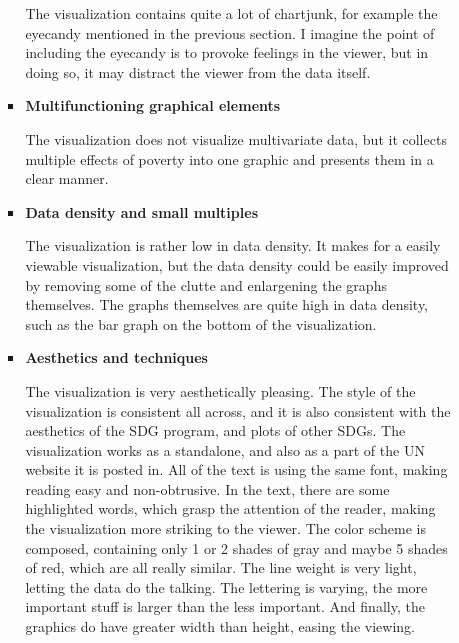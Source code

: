 \documentclass[11pt,a4paper,titlepage]{article}
\begin{document}
\begin{enumerate}
\begin{enumerate}
\begin{itemize}
            The visualization contains quite a lot of chartjunk, for example the eyecandy mentioned in the previous section. I imagine the point of including the eyecandy is to provoke feelings in the viewer, but in doing so, it may distract the viewer from the data itself.
            \item \textbf{Multifunctioning graphical elements}
            
            The visualization does not visualize multivariate data, but it collects multiple effects of poverty into one graphic and presents them in a clear manner.
            \item \textbf{Data density and small multiples}
            
            The visualization is rather low in data density. It makes for a easily viewable visualization, but the data density could be easily improved by removing some of the clutte and enlargening the graphs themselves. The graphs themselves are quite high in data density, such as the bar graph on the bottom of the visualization.
            \item \textbf{Aesthetics and techniques}
            
            The visualization is very aesthetically pleasing. The style of the visualization is consistent all across, and it is also consistent with the aesthetics of the SDG program, and plots of other SDGs. The visualization works as a standalone, and also as a part of the UN website it is posted in. All of the text is using the same font, making reading easy and non-obtrusive. In the text, there are some highlighted words, which grasp the attention of the reader, making the visualization more striking to the viewer. The color scheme is composed, containing only 1 or 2 shades of gray and maybe 5 shades of red, which are all really similar. The line weight is very light, letting the data do the talking. The lettering is varying, the more important stuff is larger than the less important. And finally, the graphics do have greater width than height, easing the viewing.
        \end{itemize}
        

\end{enumerate}
\end{enumerate}
\end{document}
